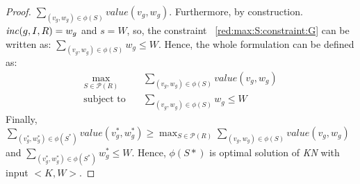 \begin{proof}
    $\sum_{(v_g,w_g) \in \phi(S)} \mathit{value}(v_g,w_g)$.
    Furthermore, by construction. $\mathit{inc}(g,I,R) = w_g$ and $s = W$, so, the constraint 
    ~\ref{red:max:S:constraint:G} can be written as: 
    $\sum_{(v_g,w_g) \in \phi(S)} w_g \le W$.
    Hence, the whole formulation can be defined as:
    \begin{align}
        \label{red:max:Z:f}
        \max_{S \in \mathcal{P}(R)} & \sum_{(v_g,w_g) \in \phi(S)} \mathit{value}(v_g,w_g)\\
        \label{red:max:Z:constraint:G}
        \text{subject to} \quad & \sum_{(v_g,w_g) \in \phi(S)} w_g \le W
    \end{align}
    Finally, $\sum_{(v_g^*,w_g^*) \in \phi(S^*)} \mathit{value}(v_g^*,w_g^*)  \ge \max_{S \in \mathcal{P}(R)}  
    \sum_{(v_g,w_g) \in \phi(S)} \mathit{value}(v_g,w_g)$\\
    and $\sum_{(v_g^*,w_g^*) \in \phi(S^*)} w_g^* \le W$.
    Hence, $\phi(S*)$ is optimal solution of \textit{KN} with input $<K,W>$.
\end{proof}
